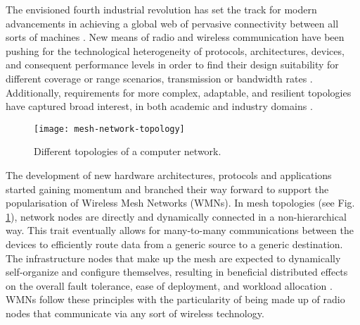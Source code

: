 The envisioned fourth industrial revolution has set the track for modern advancements in achieving a global web of pervasive connectivity between all sorts of machines \cite{akyildiz2005wireless, cilfone2019wireless}. New means of radio and wireless communication have been pushing for the technological heterogeneity of protocols, architectures, devices, and consequent performance levels in order to find their design suitability for different coverage or range scenarios, transmission or bandwidth rates \cite{sichitiu2005wireless}. Additionally, requirements for more complex, adaptable, and resilient topologies have captured broad interest, in both academic and industry domains \cite{cilfone2019wireless}. 

\begin{figure} [ht]
  \begin{center}
  \texttt{[image: mesh-network-topology]}
  \caption{Different topologies of a computer network.}
  \label{fig:mesh-network-topology}
  \end{center}
\end{figure}


The development of new hardware architectures, protocols and applications started gaining momentum and branched their way forward to support the popularisation of Wireless Mesh Networks (WMNs). In mesh topologies (see Fig. \ref{fig:mesh-network-topology}), network nodes are directly and dynamically connected in a non-hierarchical way. This trait eventually allows for many-to-many communications between the devices to efficiently route data from a generic source to a generic destination. The infrastructure nodes that make up the mesh are expected to dynamically self-organize and configure themselves, resulting in beneficial distributed effects on the overall fault tolerance, ease of deployment, and workload allocation \cite{cilfone2019wireless, sichitiu2005wireless}. WMNs follow these principles with the particularity of being made up of radio nodes that communicate via any sort of wireless technology.

